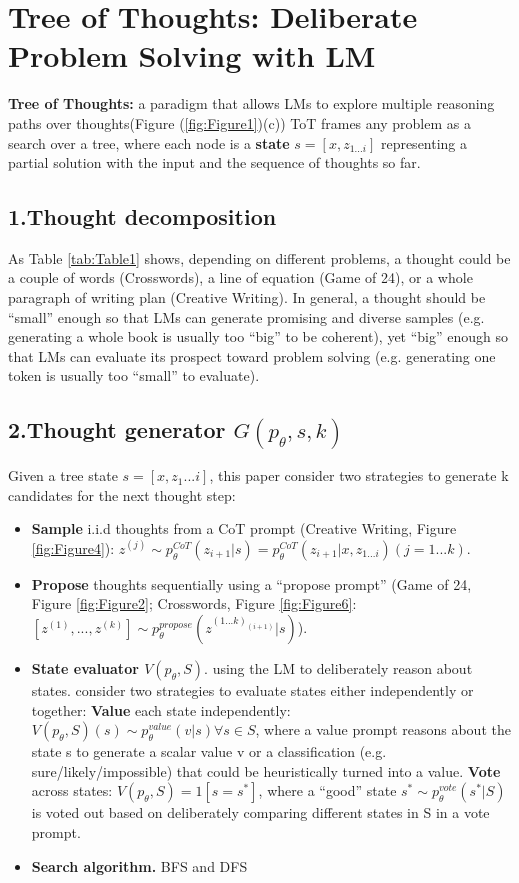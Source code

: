 \documentclass{article}
\begin{document}
\section{Tree of Thoughts: Deliberate Problem Solving with LM}

\textbf{Tree of Thoughts:} a paradigm that allows LMs to explore multiple reasoning paths over thoughts(Figure (\ref{fig:Figure1})(c))
ToT frames any problem as a search over a tree, where each node is a \textbf{state} $s = [x,z_{1...i}]$ representing a partial solution with the input and the sequence of thoughts so far.

\subsection*{1.Thought decomposition}
As Table \ref{tab:Table1} shows, depending on different problems, a thought could be a couple of words (Crosswords), a line of equation (Game of 24), or a whole paragraph of writing plan (Creative Writing).
In general, a thought should be “small” enough so that LMs can generate promising and diverse samples (e.g. generating a whole book is usually too “big” to be coherent), yet “big” enough so that LMs can evaluate its prospect toward problem solving (e.g. generating one token is usually too “small” to evaluate).

\subsection*{2.Thought generator $G(p_{\theta},s,k)$}
Given a tree state $s = [x,z_1...i]$, this paper consider two strategies to generate k candidates for the next thought step:
\begin{itemize}
    \item \textbf{Sample} i.i.d thoughts from a CoT prompt (Creative Writing, Figure \ref{fig:Figure4}): $z^{(j)} \sim p^{CoT}_{\theta}(z_{i+1}|s) = p^{CoT}_{\theta}(z_{i+1}|x,z_{1...i})(j=1...k)$.
    \item \textbf{Propose} thoughts sequentially using a “propose prompt” (Game of 24, Figure \ref{fig:Figure2}; Crosswords, Figure \ref{fig:Figure6}: 
    $[z^{(1)},...,z^{(k)}]\sim p^{propose}_{\theta}(z^{(1...k)_(i+1)}|s)$).
    \item \textbf{State evaluator $V(p_{\theta},S)$}. using the LM to deliberately reason about states. consider two strategies to evaluate states either independently or together:
        \subitem \textbf{Value} each state independently: $V(p_{\theta},S)(s) \sim p^{value}_{\theta}(v|s) \forall s \in S$, where a value prompt reasons about the state s to generate a scalar value v
            or a classification (e.g. sure/likely/impossible) that could be heuristically turned into a value.
        \subitem \textbf{Vote} across states: $V(p_{\theta},S) = 1 [s = s^{*}]$, where a “good” state $s^* \sim p_{\theta}^{vote}(s^*|S)$ is voted out based on deliberately comparing different states in S in a vote prompt.
    \item \textbf{Search algorithm.} BFS and DFS
\end{itemize}
\end{document}
